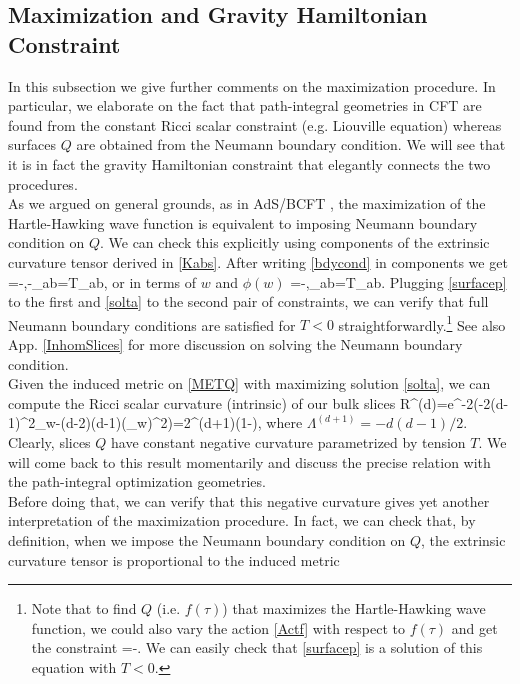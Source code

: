 \documentclass[a4paper,12pt]{article}
\begin{document}
\subsection{Maximization and Gravity Hamiltonian Constraint}
In this subsection we give further comments on the maximization procedure. In particular, we elaborate on the fact that path-integral geometries in CFT are found from the constant Ricci scalar constraint (e.g. Liouville equation) whereas surfaces $Q$ are obtained from the Neumann boundary condition. We will see that it is in fact the gravity Hamiltonian constraint that elegantly connects the two procedures.\\ 
As we argued on general grounds, as in AdS/BCFT \cite{Ta}, the maximization of the Hartle-Hawking wave function is equivalent to imposing Neumann boundary condition on $Q$. We can check this explicitly using components of the extrinsic curvature tensor derived in \eqref{Kabs}. After writing \eqref{bdycond} in components we get
\be
{}=-,\quad -\delta_{ab}=T\delta_{ab},\label{NBCt}
\ee
or in terms of $w$ and $\phi(w)$ 
\be
{}=-,\qquad {}\delta_{ab}=T\delta_{ab}.\label{NBCw}
\ee
Plugging \eqref{surfacep} to the first and \eqref{solta} to the second pair of constraints, we can verify that full Neumann boundary conditions are satisfied for $T<0$ straightforwardly.\footnote{Note that to find $Q$ (i.e. $f(\tau)$) that maximizes the Hartle-Hawking wave function, we could also vary the action \eqref{Actf} with respect to $f(\tau)$ and get the constraint
\be
{}=-.
\ee
We  can easily check that \eqref{surfacep} is a solution of this equation with $T<0$.} See also App. \ref{InhomSlices} for more discussion on solving the Neumann boundary condition.\\
Given the induced metric on \eqref{METQ} with maximizing solution \eqref{solta}, we can compute the Ricci scalar curvature (intrinsic) of our bulk slices 
\be
R^{(d)}=e^{-2\phi}(-2(d-1)\partial^2_w\phi-(d-2)(d-1)(\partial_w\phi)^2)=2\Lambda^{(d+1)}\left(1-\right),\label{Riccid}
\ee
where $\Lambda^{(d+1)}=-d(d-1)/2$. Clearly, slices $Q$ have constant negative curvature parametrized by tension $T$. We will come back to this result momentarily and discuss the precise relation with the path-integral optimization geometries.\\ Before doing that, we can verify that this negative curvature gives yet another interpretation of the maximization procedure. In fact, we can check that, by definition, when we impose the Neumann boundary condition on $Q$, the extrinsic curvature tensor is proportional to the induced metric
\end{document}

